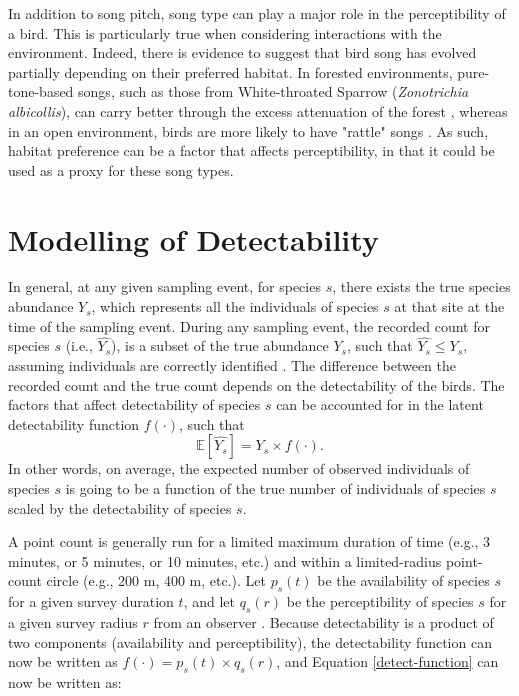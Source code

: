 \par In addition to song pitch, song type can play a major role in the perceptibility of a bird.
This is particularly true when considering interactions with the environment.
Indeed, there is evidence to suggest that bird song has evolved partially depending on their preferred habitat.
In forested environments, pure-tone-based songs, such as those from White-throated Sparrow (\textit{Zonotrichia albicollis}), can carry better through the excess attenuation of the forest \citep{morton_ecological_1975, brumm_environmental_2009}, whereas in an open environment, birds are more likely to have "rattle" songs \citep{wiley_associations_1991}.
As such, habitat preference can be a factor that affects perceptibility, in that it could be used as a proxy for these song types.

\section{Modelling of Detectability}

\par In general, at any given sampling event, for species $s$, there exists the true species abundance $Y_s$, which represents all the individuals of species $s$ at that site at the time of the sampling event. During any sampling event, the recorded count for species $s$ (i.e., $\hat{Y_s}$), is a subset of the true abundance $Y_s$, such that $\hat{Y_s} \leq Y_s$, assuming individuals are correctly identified \citep{bennett_how_2024, johnson_defense_2008}. The difference between the recorded count and the true count depends on the detectability of the birds. The factors that affect detectability of species $s$ can be accounted for in the latent detectability function $f(\cdot)$, such that
\begin{equation}\label{detect-function}
	\mathbb{E}\left[\hat{Y_s}\right] = Y_s \times f(\cdot).
\end{equation}
In other words, on average, the expected number of observed individuals of species $s$ is going to be a function of the true number of individuals of species $s$ scaled by the detectability of species $s$.

\par A point count is generally run for a limited maximum duration of time (e.g., 3 minutes, or 5 minutes, or 10 minutes, etc.) and within a limited-radius point-count circle (e.g., 200 m, 400 m, etc.).
Let $p_s(t)$ be the availability of species $s$ for a given survey duration $t$, and let $q_s(r)$ be the perceptibility of species $s$ for a given survey radius $r$ from an observer \citep{solymos_calibrating_2013}. 
Because detectability is a product of two components (availability and perceptibility), the detectability function can now be written as $f(\cdot) = p_s(t) \times q_s(r)$, and Equation \ref{detect-function} can now be written as:

